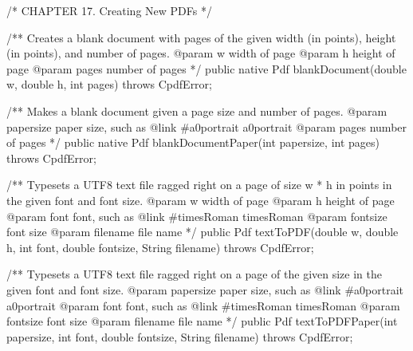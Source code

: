 /* CHAPTER 17. Creating New PDFs */

/** Creates a blank document with pages of the given width (in points),
height (in points), and number of pages.
@param w width of page
@param h height of page
@param pages number of pages */
public native Pdf blankDocument(double w, double h, int pages)
    throws CpdfError;

/** Makes a blank document given a page size and number of pages.
@param papersize paper size, such as {@link #a0portrait a0portrait}
@param pages number of pages */
public native Pdf blankDocumentPaper(int papersize, int pages)
    throws CpdfError;

/** Typesets a UTF8 text file ragged right on a page of size w * h in
points in the given font and font size.
@param w width of page
@param h height of page
@param font font, such as {@link #timesRoman timesRoman}
@param fontsize font size
@param filename file name */
public Pdf textToPDF(double w, double h, int font, double fontsize,
                     String filename)
    throws CpdfError;

/** Typesets a UTF8 text file ragged right on a page of the given size in
the given font and font size.
@param papersize paper size, such as {@link #a0portrait a0portrait}
@param font font, such as {@link #timesRoman timesRoman}
@param fontsize font size
@param filename file name */
public Pdf textToPDFPaper(int papersize, int font, double fontsize,
                          String filename)
    throws CpdfError;
